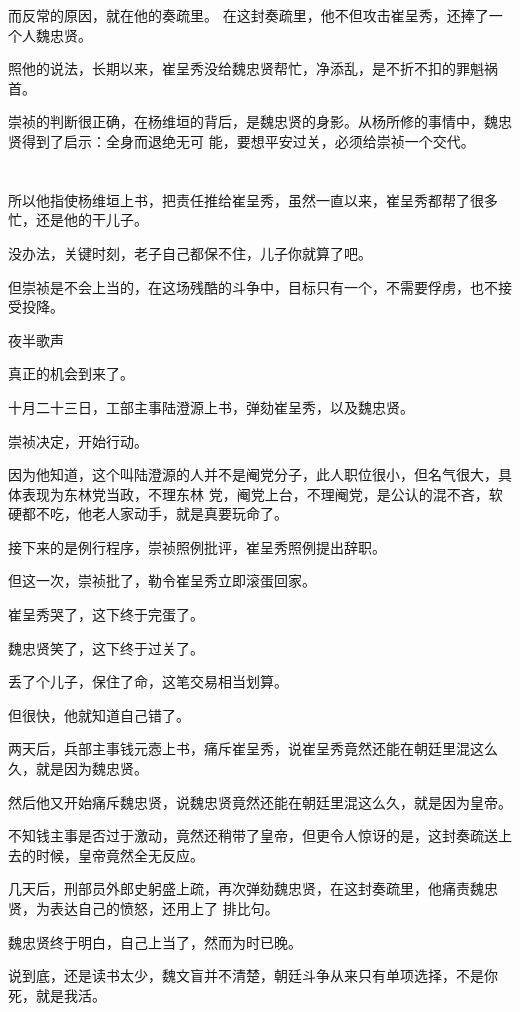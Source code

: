 \documentclass[11pt,a4paper,onecolumn]{article}
\begin{document}
而反常的原因，就在他的奏疏里。 在这封奏疏里，他不但攻击崔呈秀，还捧了一个人\myrule 魏忠贤。

照他的说法，长期以来，崔呈秀没给魏忠贤帮忙，净添乱，是不折不扣的罪魁祸首。

崇祯的判断很正确，在杨维垣的背后，是魏忠贤的身影。从杨所修的事情中，魏忠贤得到了启示：全身而退绝无可
能，要想平安过关，必须给崇祯一个交代。

\section[\thesection]{}

所以他指使杨维垣上书，把责任推给崔呈秀，虽然一直以来，崔呈秀都帮了很多忙，还是他的干儿子。

没办法，关键时刻，老子自己都保不住，儿子你就算了吧。

但崇祯是不会上当的，在这场残酷的斗争中，目标只有一个，不需要俘虏，也不接受投降。

夜半歌声

真正的机会到来了。

十月二十三日，工部主事陆澄源上书，弹劾崔呈秀，以及魏忠贤。

崇祯决定，开始行动。

因为他知道，这个叫陆澄源的人并不是阉党分子，此人职位很小，但名气很大，具体表现为东林党当政，不理东林
党，阉党上台，不理阉党，是公认的混不吝，软硬都不吃，他老人家动手，就是真要玩命了。

接下来的是例行程序，崇祯照例批评，崔呈秀照例提出辞职。

但这一次，崇祯批了，勒令崔呈秀立即滚蛋回家。

崔呈秀哭了，这下终于完蛋了。

魏忠贤笑了，这下终于过关了。

丢了个儿子，保住了命，这笔交易相当划算。

但很快，他就知道自己错了。

两天后，兵部主事钱元悫上书，痛斥崔呈秀，说崔呈秀竟然还能在朝廷里混这么久，就是因为魏忠贤。

然后他又开始痛斥魏忠贤，说魏忠贤竟然还能在朝廷里混这么久，就是因为皇帝。

不知钱主事是否过于激动，竟然还稍带了皇帝，但更令人惊讶的是，这封奏疏送上去的时候，皇帝竟然全无反应。

几天后，刑部员外郎史躬盛上疏，再次弹劾魏忠贤，在这封奏疏里，他痛责魏忠贤，为表达自己的愤怒，还用上了
排比句。

魏忠贤终于明白，自己上当了，然而为时已晚。

说到底，还是读书太少，魏文盲并不清楚，朝廷斗争从来只有单项选择，不是你死，就是我活。
\end{document}
